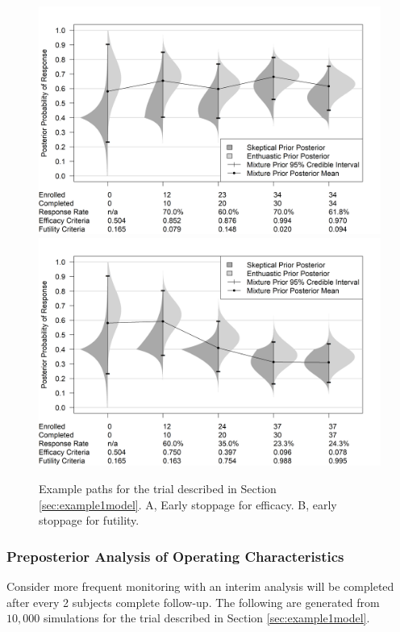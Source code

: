 \documentclass[12pt]{article}
\begin{document}
\begin{figure}\begin{center}
    \includegraphics[width=7in]{./FIGURES/figure2a.png}
    \includegraphics[width=7in]{./FIGURES/figure2b.png}
    \caption{Example paths for the trial described in Section \ref{sec:example1model}. A, Early stoppage for efficacy. B, early stoppage for futility.}
	\label{fig:figure2}

 
\end{center}\end{figure}
\subsubsection{Preposterior Analysis of Operating Characteristics}\label{sec:ex1.1}
Consider more frequent monitoring with an interim analysis will be completed after every 2 subjects complete follow-up. The following are generated from $10,000$ simulations for the trial described in Section \ref{sec:example1model}.
\end{document}
